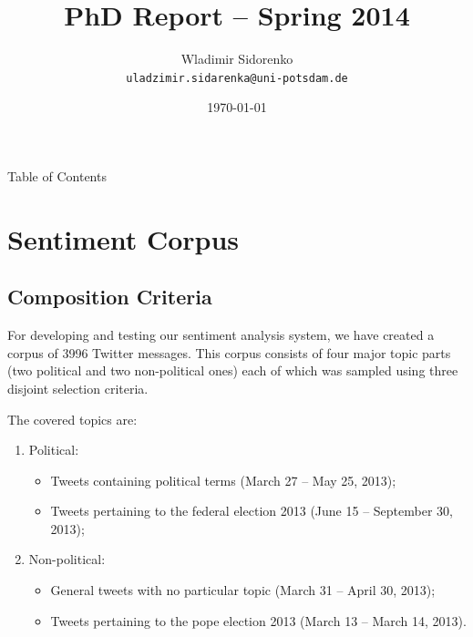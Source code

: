 \documentclass{beamer}
\title[Report 2014]{PhD Report -- Spring 2014}
\author[Sidorenko]{Wladimir Sidorenko\\ \texttt{uladzimir.sidarenka{@}uni-potsdam.de}}
\institute[Uni Potsdam]{University of Potsdam}
\date{\today}
\begin{document}
    \begin{frame}{}
      \titlepage
    \end{frame}

    \begin{frame}{Table of Contents}
      \tableofcontents
    \end{frame}

    \section{Sentiment Corpus}
    \subsection{Composition Criteria}
    \begin{frame}{\insertsubsection}
      For developing and testing our sentiment analysis system, we
      have created a corpus of 3996 Twitter messages.  This corpus
      consists of four major topic parts (two political and two
      non-political ones) each of which was sampled using three
      disjoint selection criteria.
    \end{frame}

    \begin{frame}{\insertsubsection}
      The covered topics are:
      \begin{enumerate}
      \item Political:
        \begin{itemize}
        \item Tweets containing political terms {\tiny(March 27 --
          May 25, 2013)};
        \item Tweets pertaining to the federal election 2013
          {\tiny(June 15 -- September 30, 2013)};
        \end{itemize}

      \item Non-political:
        \begin{itemize}
        \item General tweets with no particular topic {\tiny(March
          31 -- April 30, 2013)};
        \item Tweets pertaining to the pope election 2013
          {\tiny(March 13 -- March 14, 2013)}.
        \end{itemize}
      \end{enumerate}
    \end{frame}
\end{document}
